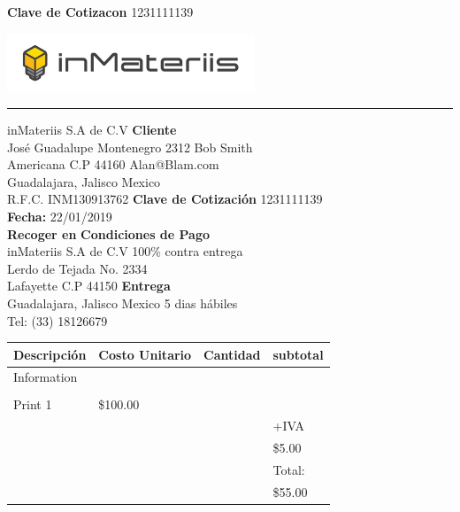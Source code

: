 \documentclass[12pt]{report}
\begin{document}
\begin{flushright} \textbf{Clave de Cotizacon} 1231111139\end{flushright}
\includegraphics[width=20em]{inmats.jpg}
\hrule
\vspace{1cm}
 
{\noindent
inMateriis S.A de C.V \hfill \textbf{Cliente} \hspace{10em} \\
Jos\'e Guadalupe Montenegro 2312 \hfill Bob Smith\hspace{8.5em} \\
Americana C.P 44160 \hfill Alan@Blam.com\hspace{8em} \\
Guadalajara, Jalisco Mexico \\
 
\noindent
R.F.C. INM130913762 \hfill \textbf{Clave de Cotizaci\'on} 1231111139 \\
\textbf{Fecha:} 22/01/2019 \\
 
\noindent
\textbf{Recoger en}  \hfill \textbf{Condiciones de Pago} \hspace{4em} \\
inMateriis S.A de C.V  \hfill 100\% contra entrega \hspace{5.5em} \\
Lerdo de Tejada No. 2334 \\
Lafayette C.P 44150  \hfill \textbf{Entrega} \hspace{10.5em} \\
Guadalajara, Jalisco Mexico   \hfill 5 dias h\'abiles \hspace{8.5em} \\
Tel: (33) 18126679\\
\begin{center}
\begin{large}
\begin{tabular}{| >{\centering\arraybackslash}m{3cm} | >{\centering\arraybackslash}m{4cm} | >{\centering\arraybackslash}m{2cm} |  >{\centering\arraybackslash}m{4cm}|} 
\hline
Descripci\'on & Costo Unitario & Cantidad & subtotal \\
\hline
Information & & &\\
& & &\\ 
Print 1 & \$100.00 &1 &  \\& & & +IVA \\ 
& & & \$5.00\\ 
& & & Total: \\ 
& & & \$55.00\\ 
 \hline
 \end{tabular}
 \end{large}
 

\end{center}}
\end{document}
